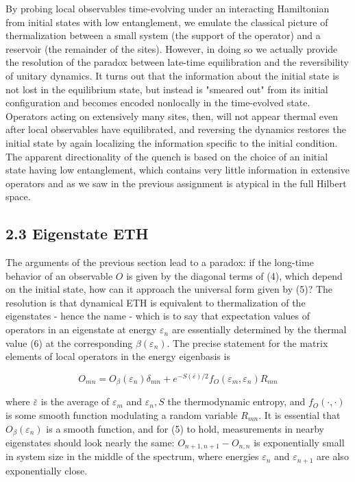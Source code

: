 \documentclass[12pt]{article}
\begin{document}
By probing local observables time-evolving under an interacting Hamiltonian from initial states with low entanglement, we emulate the classical picture of thermalization between a small system (the support of the operator) and a reservoir (the remainder of the sites). However, in doing so we actually provide the resolution of the paradox between late-time equilibration and the reversibility of unitary dynamics. It turns out that the information about the initial state is not lost in the equilibrium state, but instead is "smeared out" from its initial configuration and becomes encoded nonlocally in the time-evolved state. Operators acting on extensively many sites, then, will not appear thermal even after local observables have equilibrated, and reversing the dynamics restores the initial state by again localizing the information specific to the initial condition. The apparent directionality of the quench is based on the choice of an initial state having low entanglement, which contains very little information in extensive operators and as we saw in the previous assignment is atypical in the full Hilbert space.

\subsection*{2.3 Eigenstate ETH}
The arguments of the previous section lead to a paradox: if the long-time behavior of an observable $O$ is given by the diagonal terms of (4), which depend on the initial state, how can it approach the universal form given by (5)? The resolution is that dynamical ETH is equivalent to thermalization of the eigenstates - hence the name - which is to say that expectation values of operators in an eigenstate at energy $\varepsilon_{n}$ are essentially determined by the thermal value (6) at the corresponding $\beta\left(\varepsilon_{n}\right)$. The precise statement for the matrix elements of local operators in the energy eigenbasis is


\begin{equation*}
O_{m n}=O_{\beta}\left(\varepsilon_{n}\right) \delta_{m n}+e^{-S(\bar{\varepsilon}) / 2} f_{O}\left(\varepsilon_{m}, \varepsilon_{n}\right) R_{m n} \tag{7}
\end{equation*}


where $\bar{\varepsilon}$ is the average of $\varepsilon_{m}$ and $\varepsilon_{n}, S$ the thermodynamic entropy, and $f_{O}(\cdot, \cdot)$ is some smooth function modulating a random variable $R_{m n}$. It is essential that $O_{\beta}\left(\varepsilon_{n}\right)$ is a smooth function, and for (5) to hold, measurements in nearby eigenstates should look nearly the same: $O_{n+1, n+1}-O_{n, n}$ is exponentially small in system size in the middle of the spectrum, where energies $\varepsilon_{n}$ and $\varepsilon_{n+1}$ are also exponentially close.
\end{document}

